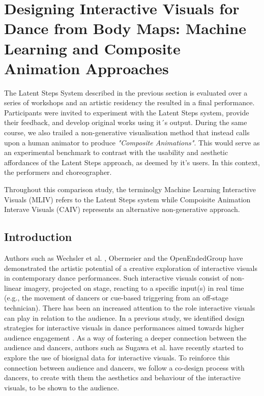 \section{Designing Interactive Visuals for Dance from Body Maps: Machine Learning and Composite Animation Approaches}

The Latent Steps System described in the previous section is evaluated over a series of workshops and an artistic residency the resulted in a final performance. Participants were invited to experiment with the Latent Steps system, provide their feedback, and develop original works using it´s output. During the same course, we also trailed a non-generative visualisation method that instead calls upon a human animator to produce \textit{"Composite Animations"}. This would serve as an experimental benchmark to contrast with the usability and aesthetic affordances of the Latent Steps approach, as deemed by it's users. In this context, the performers and choreographer.

Throughout this comparison study, the terminolgy Machine Learning Interactive Visuals (MLIV) refers to the Latent Steps system while Compoisite Animation Interave Visuals (CAIV) represents an alternative non-generative approach.

\subsection{Introduction}

Authors such as Wechsler et al. \cite{wechsler_eyecon_2004}, Obermeier \cite{monteverdi_klaus_2007} and the OpenEndedGroup \cite{downie_choreographing_2005} have demonstrated the artistic potential of a creative exploration of interactive visuals in contemporary dance performances. Such interactive visuals consist of non-linear imagery, projected on stage, reacting to a specific input(s) in real time (e.g., the movement of dancers or cue-based triggering from an off-stage technician). There has been an increased attention to the role interactive visuals can play in relation to the audience. In a previous study, we identified design strategies for interactive visuals in dance performances aimed towards higher audience engagement \cite{correia_connected_2021}. As a way of fostering a deeper connection between the audience and dancers, authors such as Sugawa et al. \cite{sugawa_boiling_2021} have recently started to explore the use of biosignal data for interactive visuals. To reinforce this connection between audience and dancers, we follow a co-design process with dancers, to create with them the aesthetics and behaviour of the interactive visuals, to be shown to the audience.

